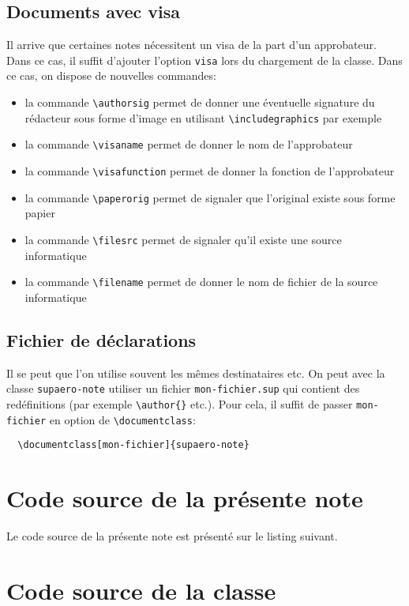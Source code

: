 \documentclass[fr,biblatex]{supaero-note}
\begin{document}
\subsection{Documents avec visa}
\label{sec:documents-avec-visa}

Il arrive que certaines notes nécessitent un visa de la part d'un
approbateur. Dans ce cas, il suffit d'ajouter l'option \verb!visa!
lors du chargement de la classe. Dans ce cas, on dispose de nouvelles
commandes:

\begin{itemize}
\item la commande \verb!\authorsig! permet de donner une éventuelle
  signature du rédacteur sous forme d'image en utilisant
  \verb!\includegraphics! par exemple
\item la commande \verb!\visaname! permet de donner le nom de
  l'approbateur
\item la commande \verb!\visafunction! permet de donner la fonction de
  l'approbateur
\item la commande \verb!\paperorig! permet de signaler que l'original
  existe sous forme papier
\item la commande \verb!\filesrc! permet de signaler qu'il existe une
  source informatique
\item la commande \verb!\filename! permet de donner le nom de fichier
  de la source informatique
\end{itemize}

\subsection{Fichier de déclarations}
\label{sec:fich-de-decl}

Il se peut que l'on utilise souvent les mêmes destinataires etc. On
peut avec la classe \texttt{supaero-note} utiliser un fichier
\texttt{mon-fichier.sup} qui contient des redéfinitions (par exemple
\verb!\author{}! etc.). Pour cela, il suffit de passer
\verb!mon-fichier! en option de \verb!\documentclass!:

\begin{verbatim}
  \documentclass[mon-fichier]{supaero-note}
\end{verbatim}

\section{Code source de la présente note}
\label{sec:code-source}

Le code source de la présente note est présenté sur le listing
suivant.



\section{Code source de la classe}
\label{sec:code-source-supaero-note}



\printbibliography
\end{document}
